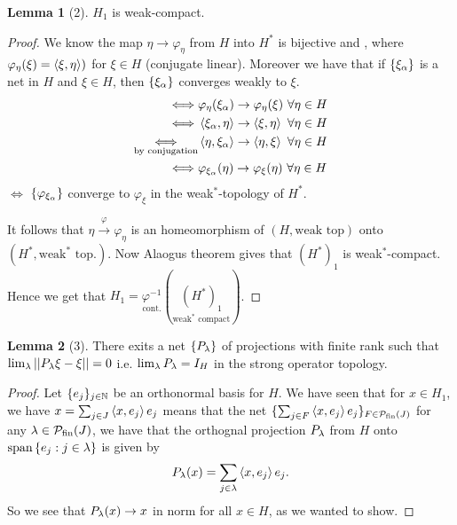 \documentclass[10pt,english,a4paper]{article}
\theoremstyle{definition}
\newtheorem*{lemma}{Lemma}
\let\emph\relax %
\def\Psfin{\mathcal{P}_{\textnormal{fin}}}
\def\vphi{\varphi}
\begin{document}
\begin{lemma}[2]
    $H_1$ is weak-compact. 
\end{lemma}

\begin{proof}
    We know the map $\eta  \to \vphi_{\eta}$ from $H $ into $H^*$ is bijective 
and \emph{isometric}, where $\varphi_{\eta}(\xi) = \left\langle \xi,\eta \right\rangle)$ for $\xi \in H$
(conjugate linear). Moreover we have that if $\{\xi_{\alpha}\}$ is a net in $H$
and $\xi \in H$, then $\{\xi_{\alpha}\}$ converges weakly to $\xi$.
 \begin{align*}
     \iff& \varphi_{\eta}(\xi_{\al}) \to \varphi_{\eta}(\xi) ~\forall \eta \in H \\
     \iff& \ind{\xi_{\al},\eta} \to \ind{\xi,\eta} ~\forall \eta \in H \\
     \underset{\text{by conjugation}}{\iff}& \ind{\eta, \xi_{\al}} \to \ind{\eta, \xi} ~\forall \eta \in H \\
\iff&\vphi_{\xi_{\al}}(\eta) \to \varphi_{\xi}(\eta) ~\forall\eta\in H
 \end{align*}
$\iff$ $\{\vphi_{\xi_{\al}}\}$ converge to $\vphi_{\xi}$ in the weak$^*$-topology
of $H^*$.

It follows that $\eta \overset{\varphi}{\to} \varphi_{\eta}$ is an
homeomorphism of $(H,\text{weak top})$ onto $(H^*, \text{weak}^*\text{ top.})$.
Now Alaogus theorem gives that $(H^*)_1$ is weak$^*$-compact. 
Hence we get that $H_1 = \underset{\text{cont.}}{\varphi^{-1}}(\underset{\text{weak}^*\text{ compact}}{(H^*)_1})$.
\end{proof}

\begin{lemma}[3]
    There exits a net $\{P_{\lambda}\}$ of projections with finite rank such that 
    $\lim_{\lambda} ||P_{\lambda} \xi - \xi|| = 0$ i.e. $\lim_{\lambda} P_{\lambda} = I_{H}$ 
    in the strong operator topology. 
\end{lemma}
\begin{proof}
   Let $\{e_j\}_{j\in \mathbb{N}}$ be an orthonormal basis for $H$. We have seen that for $x \in H_1$, 
we have $x = \sum_{j \in J} \left\langle x,e_j \right\rangle e_j$ means that the net $\{ \sum_{j\in F} \ind{x,e_j}e_j \}_{F\in\Psfin(J)}$ for any $\la \in \Psfin(J)$, we have that the orthognal projection
$P_{\lambda}$ from $H$ onto  $\text{span} \left\{e_j:j\in \lambda\right\}$ is given by 
\[ P_{\lambda}(x) = \sum_{j\in\lambda} \left\langle x,e_j \right\rangle e_j. \]
So we see that $P_{\lambda}(x) \to x$ in norm for all $x \in H$, as we wanted to show.
\end{proof}
\end{document}
